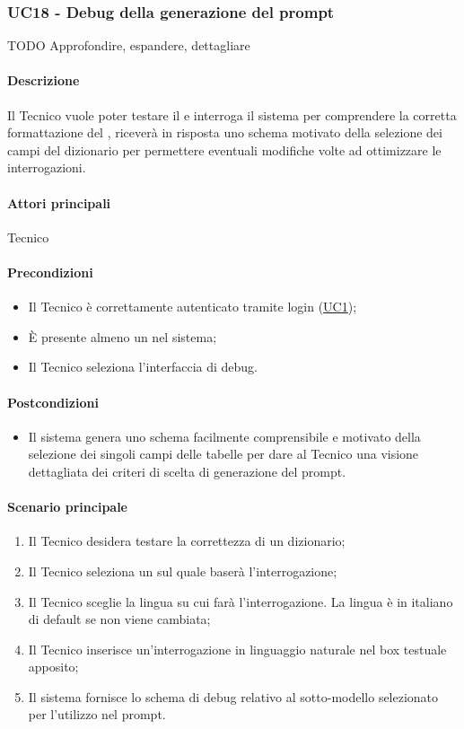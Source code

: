 \subsubsection{UC18 - Debug della generazione del prompt}\label{UC18}
TODO Approfondire, espandere, dettagliare
\paragraph*{Descrizione}
Il Tecnico vuole poter testare il  e interroga il sistema per comprendere la corretta formattazione del , riceverà in risposta uno schema motivato della selezione dei campi del dizionario per permettere eventuali modifiche volte ad ottimizzare le interrogazioni.

\paragraph*{Attori principali}
Tecnico

\paragraph*{Precondizioni}
\begin{itemize}
  \item Il Tecnico è correttamente autenticato tramite login (\hyperref[UC1]{UC1});
  \item È presente almeno un  nel sistema;
  \item Il Tecnico seleziona l’interfaccia di debug.
\end{itemize}

\paragraph*{Postcondizioni}
\begin{itemize}
  \item Il sistema genera uno schema facilmente comprensibile e motivato della selezione dei singoli campi delle tabelle per dare al Tecnico una visione dettagliata dei criteri di scelta di generazione del prompt.
\end{itemize}

\paragraph*{Scenario principale}
\begin{enumerate}
  \item Il Tecnico desidera testare la correttezza di un dizionario; 
  \item Il Tecnico seleziona un  sul quale baserà l’interrogazione;
  \item Il Tecnico sceglie la lingua su cui farà l’interrogazione. La lingua è in italiano di default se non viene cambiata;
  \item Il Tecnico inserisce un’interrogazione in linguaggio naturale nel box testuale apposito;
  \item Il sistema fornisce lo schema di debug relativo al sotto-modello selezionato per l’utilizzo nel prompt.  
\end{enumerate}

